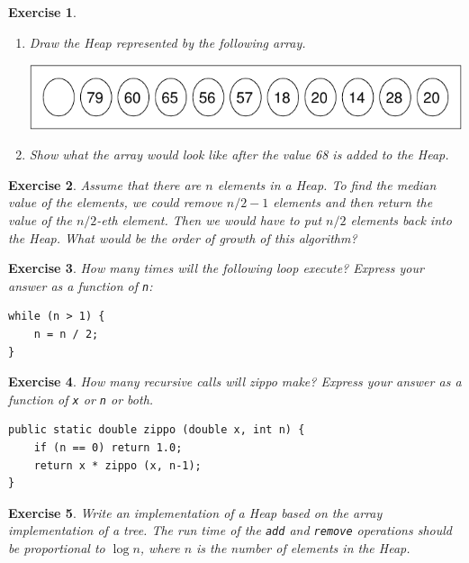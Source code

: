 \documentclass[12pt]{book}
\theoremstyle{exercise}
\newtheorem{exercise}{Exercise}[chapter]
\begin{document}
\begin{exercise}
\begin{enumerate}

\item Draw the Heap represented by the following array.

\includegraphics{figs/heap.pdf}

\item Show what the array would look like after the value
68 is added to the Heap.

\end{enumerate}
\end{exercise}

\begin{exercise}
Assume that there are $n$ elements in a Heap.  To find
the median value of the elements, we could remove $n/2-1$ elements
and then return the value of the $n/2$-eth element.  Then we
would have to put $n/2$ elements back into the Heap.  What would
be the order of growth of this algorithm?
\end{exercise}

\begin{exercise}
How many times will the following loop
execute?  Express your answer as a function of {\tt n}:

\begin{verbatim}
while (n > 1) {
    n = n / 2;
}
\end{verbatim}
\end{exercise}


\begin{exercise}
How many recursive calls will zippo make?  Express
your answer as a function of {\tt x} or {\tt n} or both.

\begin{verbatim}
public static double zippo (double x, int n) {
    if (n == 0) return 1.0;
    return x * zippo (x, n-1);
}
\end{verbatim}
\end{exercise}


\begin{exercise}
Write an implementation of a Heap based on the array implementation
of a tree.  The run time of the {\tt add} and {\tt remove} operations
should be proportional to $\log n$, where $n$ is the number of elements
in the Heap.
\end{exercise}
\end{document}

